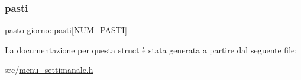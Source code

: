 \mbox{\label{structgiorno_a965ec0d1d5f6c22b57f8a94932350887}} 
\subsubsection{\texorpdfstring{pasti}{pasti}}
{\footnotesize\ttfamily \hyperlink{structpasto}{pasto} giorno\+::pasti\mbox{[}\hyperlink{menu__settimanale_8h_a2000ebf33ae486fb0f53926d79ae1c7f}{N\+U\+M\+\_\+\+P\+A\+S\+TI}\mbox{]}}



La documentazione per questa struct è stata generata a partire dal seguente file\+:\begin{DoxyCompactItemize}
\item 
src/\hyperlink{menu__settimanale_8h}{menu\+\_\+settimanale.\+h}\end{DoxyCompactItemize}
